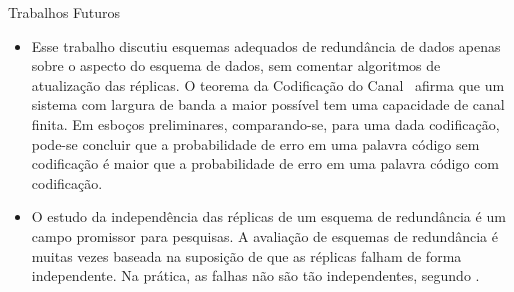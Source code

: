\begin{frame}{Trabalhos Futuros}

   \begin{itemize}

      \item Esse trabalho discutiu esquemas adequados de redundância de dados apenas sobre o aspecto do esquema de dados, sem comentar algoritmos de atualização das réplicas. O teorema da Codificação do Canal~\cite{Abrantes:2010,Schwartz:1990} afirma que um sistema com largura de banda a maior possível tem uma capacidade de canal finita. Em esboços preliminares, comparando-se, para uma dada codificação, pode-se concluir que a probabilidade de erro em uma palavra código sem codificação é maior que a probabilidade de erro em uma palavra código com codificação.

       \item O estudo da independência das réplicas de um esquema de redundância é um campo promissor para pesquisas. A avaliação de esquemas de redundância é muitas vezes baseada na suposição de que as réplicas falham de forma independente. Na prática, as falhas não são tão independentes, segundo \cite{Weatherspoon:2002:02,Baker:2006}.


  \end{itemize}

\end{frame}

